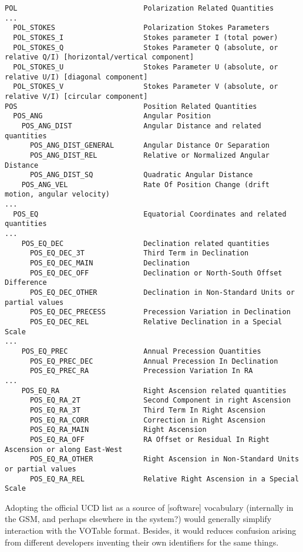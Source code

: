 \documentclass[10pt]{article}
\begin{document}
{\small\begin{verbatim}
POL                              Polarization Related Quantities
...
  POL_STOKES                     Polarization Stokes Parameters
  POL_STOKES_I                   Stokes parameter I (total power)
  POL_STOKES_Q                   Stokes Parameter Q (absolute, or relative Q/I) [horizontal/vertical component]
  POL_STOKES_U                   Stokes Parameter U (absolute, or relative U/I) [diagonal component]
  POL_STOKES_V                   Stokes Parameter V (absolute, or relative V/I) [circular component]
POS                              Position Related Quantities
  POS_ANG                        Angular Position
    POS_ANG_DIST                 Angular Distance and related quantities
      POS_ANG_DIST_GENERAL       Angular Distance Or Separation
      POS_ANG_DIST_REL           Relative or Normalized Angular Distance
      POS_ANG_DIST_SQ            Quadratic Angular Distance
    POS_ANG_VEL                  Rate Of Position Change (drift motion, angular velocity)
...
  POS_EQ                         Equatorial Coordinates and related quantities
...
    POS_EQ_DEC                   Declination related quantities
      POS_EQ_DEC_3T              Third Term in Declination
      POS_EQ_DEC_MAIN            Declination
      POS_EQ_DEC_OFF             Declination or North-South Offset Difference
      POS_EQ_DEC_OTHER           Declination in Non-Standard Units or partial values
      POS_EQ_DEC_PRECESS         Precession Variation in Declination
      POS_EQ_DEC_REL             Relative Declination in a Special Scale
...
    POS_EQ_PREC                  Annual Precession Quantities
      POS_EQ_PREC_DEC            Annual Precession In Declination
      POS_EQ_PREC_RA             Precession Variation In RA
...
    POS_EQ_RA                    Right Ascension related quantities
      POS_EQ_RA_2T               Second Component in right Ascension
      POS_EQ_RA_3T               Third Term In Right Ascension
      POS_EQ_RA_CORR             Correction in Right Ascension
      POS_EQ_RA_MAIN             Right Ascension
      POS_EQ_RA_OFF              RA Offset or Residual In Right Ascension or along East-West
      POS_EQ_RA_OTHER            Right Ascension in Non-Standard Units or partial values
      POS_EQ_RA_REL              Relative Right Ascension in a Special Scale
\end{verbatim}}

Adopting the official UCD list as a source of [software] vocabulary (internally
in the GSM, and perhaps elsewhere in the system?) would generally simplify
interaction with the VOTable format. Besides, it would reduces confusion 
arising from different developers inventing their own identifiers for the same
things.
\end{document}
